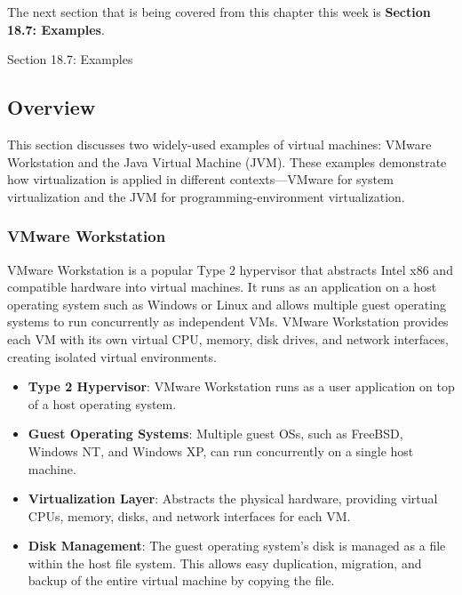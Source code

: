 The next section that is being covered from this chapter this week is \textbf{Section 18.7: Examples}.

\begin{notes}{Section 18.7: Examples}
    \subsection*{Overview}

    This section discusses two widely-used examples of virtual machines: VMware Workstation and the Java Virtual Machine (JVM). These examples demonstrate how virtualization is applied in different 
    contexts—VMware for system virtualization and the JVM for programming-environment virtualization.
    
    \subsubsection*{VMware Workstation}
    
    VMware Workstation is a popular Type 2 hypervisor that abstracts Intel x86 and compatible hardware into virtual machines. It runs as an application on a host operating system such as Windows or 
    Linux and allows multiple guest operating systems to run concurrently as independent VMs. VMware Workstation provides each VM with its own virtual CPU, memory, disk drives, and network interfaces, 
    creating isolated virtual environments.
    
    \begin{highlight}
    
        \begin{itemize}
            \item \textbf{Type 2 Hypervisor}: VMware Workstation runs as a user application on top of a host operating system.
            \item \textbf{Guest Operating Systems}: Multiple guest OSs, such as FreeBSD, Windows NT, and Windows XP, can run concurrently on a single host machine.
            \item \textbf{Virtualization Layer}: Abstracts the physical hardware, providing virtual CPUs, memory, disks, and network interfaces for each VM.
            \item \textbf{Disk Management}: The guest operating system's disk is managed as a file within the host file system. This allows easy duplication, migration, and backup of the entire virtual 
            machine by copying the file.
        \end{itemize}
    

\end{highlight}
\end{notes}
